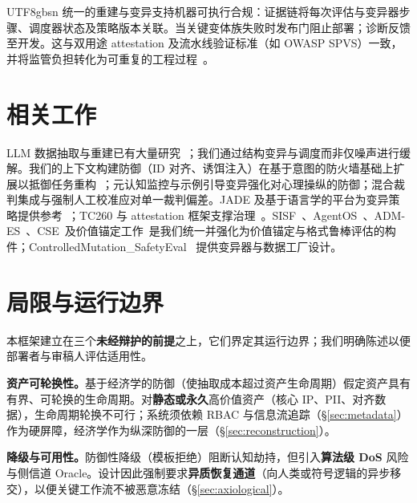\documentclass[letterpaper,twocolumn,10pt]{article}
\begin{document}
\begin{CJK}{UTF8}{gbsn}
统一的重建与变异支持机器可执行合规：证据链将每次评估与变异器步骤、调度器状态及策略版本关联。当关键变体族失败时发布门阻止部署；诊断反馈至开发。这与双用途 attestation 及流水线验证标准（如 OWASP SPVS）一致，并将监管负担转化为可重复的工程过程~\cite{ControlledMutation_SafetyEval}。

\section{相关工作}

LLM 数据抽取与重建已有大量研究~\cite{llm-reconstruction-emergent,split-ft-attack,active-reconstruction}；我们通过结构变异与调度而非仅噪声进行缓解。我们的上下文构建防御（ID 对齐、诱饵注入）在基于意图的防火墙基础上扩展以抵御任务重构~\cite{agentos-arxiv}；元认知监控与示例引导变异强化对心理操纵的防御；混合裁判集成与强制人工校准应对单一裁判偏差。JADE 及基于语言学的平台为变异策略提供参考~\cite{jade-linguistics,jade-db}；TC260 与 attestation 框架支撑治理~\cite{tc260-governance,tc260-training-data,dual-use-attestations}。SISF~\cite{sisf-arxiv}、AgentOS~\cite{agentos-arxiv}、ADM-ES~\cite{adm-es-arxiv}、CSE~\cite{cse-arxiv}及价值锚定工作~\cite{epistemic-grounding,hpm-jailbreak}是我们统一并强化为价值锚定与格式鲁棒评估的构件；ControlledMutation\_SafetyEval~\cite{ControlledMutation_SafetyEval} 提供变异器与数据工厂设计。

\section{局限与运行边界}

本框架建立在三个\textbf{未经辩护的前提}之上，它们界定其运行边界；我们明确陈述以便部署者与审稿人评估适用性。

\textbf{资产可轮换性。}基于经济学的防御（使抽取成本超过资产生命周期）假定资产具有有界、可轮换的生命周期。对\textbf{静态或永久}高价值资产（核心 IP、PII、对齐数据），生命周期轮换不可行；系统须依赖 RBAC 与信息流追踪（\S\ref{sec:metadata}）作为硬屏障，经济学作为纵深防御的一层（\S\ref{sec:reconstruction}）。

\textbf{降级与可用性。}防御性降级（模板拒绝）阻断认知劫持，但引入\textbf{算法级 DoS} 风险与侧信道 Oracle。设计因此强制要求\textbf{异质恢复通道}（向人类或符号逻辑的异步移交），以便关键工作流不被恶意冻结（\S\ref{sec:axiological}）。


\end{CJK}
\end{document}
